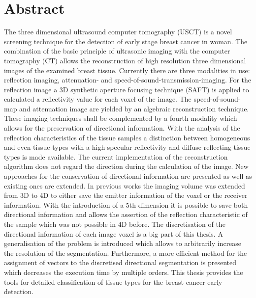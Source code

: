 \chapter*{Abstract}


The three dimensional ultrasound computer tomography (USCT) is a novel screening technique for the detection of early stage breast cancer in woman. The combination of the basic principle of ultrasonic imaging with the computer tomography (CT) allows the reconstruction of high resolution three dimensional images of the examined breast tissue. Currently there are three modalities in use: reflection imaging, attenuation- and  speed-of-sound-transmission-imaging. For the reflection image a 3D synthetic
aperture focusing technique (SAFT) is applied to calculated a reflectivity value for each voxel of the image. The speed-of-sound-map and attenuation image are yielded by an algebraic reconstruction technique. These imaging techniques shall be complemented by a fourth modality which allows for the preservation of directional information. With the analysis of the reflection characteristics of the tissue samples a distinction between homogeneous and even tissue types with a high specular reflectivity and diffuse reflecting tissue types is made available. The current implementation of the reconstruction algorithm does not regard the direction during the calculation of the image. 
New approaches for the conservation of directional information are presented as well as existing ones are extended. In previous works the imaging volume was extended from 3D to 4D to either save the emitter information of the voxel or the receiver information. With the introduction of a 5th dimension it is possible to save both directional information and allows the assertion of the reflection characteristic of the sample which was not possible in 4D before. The discretisation of the directional information of each image voxel is a big part of this thesis. A generalisation of the problem is introduced which allows to arbitrarily increase the resolution of the segmentation. Furthermore, a more efficient method for the assignment of vectors to the discretised directional segmentation is presented which decreases the execution time by multiple orders. This thesis provides the tools for detailed classification of tissue types for the breast cancer early detection. 

